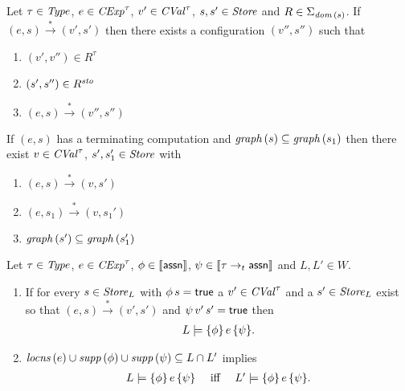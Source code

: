 \documentclass[12pt,a4paper]{report}
\newcommand{\CExp}{\nstyle{CExp}}
\newcommand{\CVal}{\nstyle{CVal}}
\newcommand{\sto}{\nstyle{sto}}
\begin{document}
\begin{lemma}
  Let $\tau\in\mathit{Type}$, $e\in\CExp^\tau$, $v'\in\CVal^\tau$, $s,s'\in\mathit{Store}$
  and $R \in \Sigma_{\mathit{dom}\,(s)}$. If $(e,s)\xrightarrow*(v',s')$ then there
  exists a configuration $(v'',s'')$ such that
  \begin{enumerate}
    \item $(v',v'')\in R^\tau$
    \item $(s',s'')\in R^\sto$
    \item $(e,s) \xrightarrow* (v'',s'')$
  \end{enumerate}
\end{lemma}

\begin{lemma}
  If $(e,s)$ has a terminating computation and $\mathit{graph}\,(s) \subseteq \mathit{graph}\,(s_1)$ then
  there exist $v\in\CVal^\tau$, $s',s_1'\in\mathit{Store}$ with
  \begin{enumerate}
    \item $(e,s) \xrightarrow* (v,s')$
    \item $(e,s_1) \xrightarrow* (v,s_1')$
    \item $\mathit{graph}\,(s') \subseteq \mathit{graph}\,(s_1')$
  \end{enumerate}
\end{lemma}

\begin{lemma}
  Let $\tau\in\mathit{Type}$, $e\in\CExp^\tau$, $\phi\in\llbracket\mathsf{assn}\rrbracket$, $\psi\in\llbracket\tau\rightarrow_t\mathsf{assn}\rrbracket$
  and $L,L'\in W$.
  \begin{enumerate}
    \item If for every $s \in \mathit{Store}_L$ with $\phi\,s=\mathsf{true}$ a $v'\in\CVal^\tau$ and a
          $s'\in\mathit{Store}_L$ exist so that $(e,s) \xrightarrow* (v',s')$ and $\psi\,v'\,s'=\mathsf{true}$ then
          \[\begin{array}{rcl}
            L\models\{\phi\}\,e\,\{\psi\}.
          \end{array}\]

    \item $\mathit{locns}\,(e)\cup\mathit{supp}\,(\phi)\cup\mathit{supp}\,(\psi) \subseteq L \cap L'$ implies
          \[\begin{array}{rcl}
            L\models\{\phi\}\,e\,\{\psi\} &\text{ iff }& L'\models\{\phi\}\,e\,\{\psi\}.
          \end{array}\]
  \end{enumerate}
\end{lemma}
\end{document}
